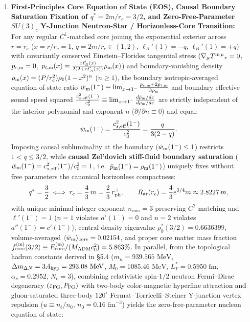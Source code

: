 \documentclass[11pt,a4paper]{article}
\begin{document}
\begin{enumerate}[label=\arabic*.]
\item \textbf{First-Principles Core Equation of State (EOS), Causal Boundary Saturation Fixation of $q^* = 2m/r_c = 3/2$, and Zero-Free-Parameter $SU(3)_c$ Y-Junction Neutron-Star / Horizonless-Core Transition:} For any regular $C^1$-matched core joining the exponential exterior across $r = r_c$ ($x = r/r_c = 1$, $q = 2m/r_c \in (1, 2)$, $\ell_A'(1) = -q$, $\ell_B'(1) = +q$) with covariantly conserved Einstein--Florides tangential stress ($\nabla_\mu T^{\rm m\,\mu}{}_r = 0$, $p_{r,\rm m} = 0$, $p_{t,\rm m}(x) = \frac{x\ell_B'(x)}{2(2+x\ell_A'(x))}\rho_{\rm m}(x)$) and boundary-vanishing density $\rho_{\rm m}(x) = (P/r_c^2)\rho_0(1-x^2)^n$ ($n \ge 1$), the boundary isotropic-averaged equation-of-state ratio $\bar{w}_{\rm m}(1^-) \equiv \lim_{x\to 1^-}\frac{p_{r,\rm m}+2p_{t,\rm m}}{3\rho_{\rm m}}$ and boundary effective sound speed squared $\frac{c_{s,\rm eff}^2(1^-)}{c_0^2} \equiv \lim_{x\to 1^-}\frac{d\bar{p}_{\rm m}/dx}{d\rho_{\rm m}/dx}$ are strictly independent of the interior polynomial and exponent $n$ ($\partial/\partial n \equiv 0$) and equal:
\begin{equation}
\bar{w}_{\rm m}(1^-) = \frac{c_{s,\rm eff}^2(1^-)}{c_0^2} = \frac{q}{3(2 - q)}.
\end{equation}
Imposing causal subluminality at the boundary ($\bar{w}_{\rm m}(1^-) \le 1$) restricts $1 < q \le 3/2$, while \textbf{causal Zel'dovich stiff-fluid boundary saturation} ($\bar{w}_{\rm m}(1^-) = c_{s,\rm eff}^2(1^-)/c_0^2 = 1$, i.e.\ $\bar{p}_{\rm m}(1^-) = \rho_{\rm m}(1^-)$) uniquely fixes without free parameters the canonical horizonless compactness:
\begin{equation}
q^* = \frac{3}{2} \iff r_c = \frac{4}{3}\,m = \frac{2}{3}\,r_{\rm ph}^+, \qquad R_{\rm ar}(r_c) = \frac{4}{3}e^{3/4}m \approx 2.8227\,m,
\end{equation}
with unique minimal integer exponent $n_{\min} = 3$ preserving $C^2$ matching and $\ell'(1^-) = 1$ ($n=1$ violates $a'(1^-)=0$ and $n=2$ violates $a''(1^-)=c'(1^-)$), central density eigenvalue $\rho_0^*(3/2) = 0.6636399$, volume-averaged $\langle\bar{w}_{\rm m}\rangle_{\rm core} = 0.02154$, and proper core matter mass fraction $f_{\rm core}^{\rm (m)}(3/2) \equiv E_{\rm core}^{\rm (m)}/(M_{\rm ADM}c_0^2) = 5.863\%$. In parallel, from the topological hadron constants derived in \S 5.4 ($m_n = 939.565\text{ MeV}$, $\Delta m_{\Delta N} = 3 A_{\rm hyp} = 293.08\text{ MeV}$, $M_0 = 1085.46\text{ MeV}$, $L_Y^* = 0.5950\text{ fm}$, $\alpha_s = 0.2952$, $N_c = 3$), combining relativistic spin-$1/2$ neutron Fermi--Dirac degeneracy $(\varepsilon_{\rm FG}, P_{\rm FG})$ with two-body color-magnetic hyperfine attraction and gluon-saturated three-body $120^\circ$ Fermat--Torricelli--Steiner Y-junction vertex repulsion ($u \equiv n_b/n_0$, $n_0 = 0.16\text{ fm}^{-3}$) yields the zero-free-parameter nucleon equation of state:

\end{enumerate}
\end{document}
